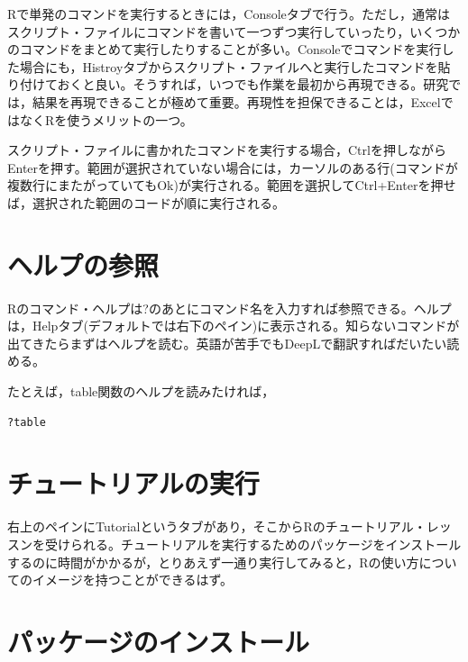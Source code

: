 \documentclass[
]{book}
\begin{document}
Rで単発のコマンドを実行するときには，Consoleタブで行う。ただし，通常はスクリプト・ファイルにコマンドを書いて一つずつ実行していったり，いくつかのコマンドをまとめて実行したりすることが多い。Consoleでコマンドを実行した場合にも，Histroyタブからスクリプト・ファイルへと実行したコマンドを貼り付けておくと良い。そうすれば，いつでも作業を最初から再現できる。研究では，結果を再現できることが極めて重要。再現性を担保できることは，ExcelではなくRを使うメリットの一つ。

スクリプト・ファイルに書かれたコマンドを実行する場合，Ctrlを押しながらEnterを押す。範囲が選択されていない場合には，カーソルのある行(コマンドが複数行にまたがっていてもOk)が実行される。範囲を選択してCtrl+Enterを押せば，選択された範囲のコードが順に実行される。

\hypertarget{ux30d8ux30ebux30d7ux306eux53c2ux7167}{%
\section{ヘルプの参照}\label{ux30d8ux30ebux30d7ux306eux53c2ux7167}}

Rのコマンド・ヘルプは?のあとにコマンド名を入力すれば参照できる。ヘルプは，Helpタブ(デフォルトでは右下のペイン)に表示される。知らないコマンドが出てきたらまずはヘルプを読む。英語が苦手でもDeepLで翻訳すればだいたい読める。

たとえば，table関数のヘルプを読みたければ，

\begin{verbatim}
?table
\end{verbatim}

\hypertarget{ux30c1ux30e5ux30fcux30c8ux30eaux30a2ux30ebux306eux5b9fux884c}{%
\section{チュートリアルの実行}\label{ux30c1ux30e5ux30fcux30c8ux30eaux30a2ux30ebux306eux5b9fux884c}}

右上のペインにTutorialというタブがあり，そこからRのチュートリアル・レッスンを受けられる。チュートリアルを実行するためのパッケージをインストールするのに時間がかかるが，とりあえず一通り実行してみると，Rの使い方についてのイメージを持つことができるはず。

\hypertarget{ux30d1ux30c3ux30b1ux30fcux30b8ux306eux30a4ux30f3ux30b9ux30c8ux30fcux30eb}{%
\section{パッケージのインストール}\label{ux30d1ux30c3ux30b1ux30fcux30b8ux306eux30a4ux30f3ux30b9ux30c8ux30fcux30eb}}
\end{document}
